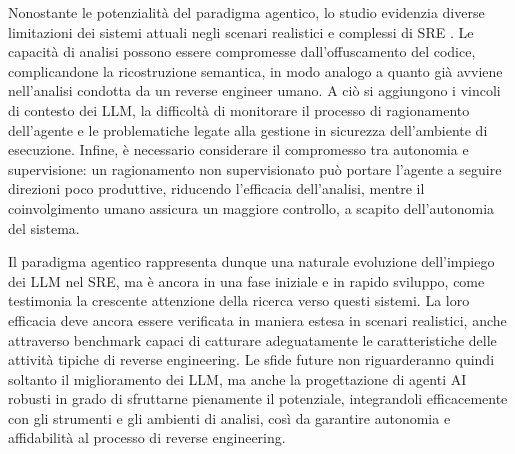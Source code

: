 
Nonostante le potenzialità del paradigma agentico, lo studio evidenzia diverse limitazioni dei sistemi attuali negli scenari realistici e complessi di SRE \cite{radey2026challenges}. Le capacità di analisi possono essere compromesse dall'offuscamento del codice, complicandone la ricostruzione semantica, in modo analogo a quanto già avviene nell'analisi condotta da un reverse engineer umano. A ciò si aggiungono i vincoli di contesto dei LLM, la difficoltà di monitorare il processo di ragionamento dell'agente e le problematiche legate alla gestione in sicurezza dell'ambiente di esecuzione. Infine, è necessario considerare il compromesso tra autonomia e supervisione: un ragionamento non supervisionato può portare l'agente a seguire direzioni poco produttive, riducendo l'efficacia dell'analisi, mentre il coinvolgimento umano assicura un maggiore controllo, a scapito dell'autonomia del sistema.



Il paradigma agentico rappresenta dunque una naturale evoluzione dell'impiego dei LLM nel SRE, ma è ancora in una fase iniziale e in rapido sviluppo, come testimonia la crescente attenzione della ricerca verso questi sistemi. La loro efficacia deve ancora essere verificata in maniera estesa in scenari realistici, anche attraverso benchmark capaci di catturare adeguatamente le caratteristiche delle attività tipiche di reverse engineering. Le sfide future non riguarderanno quindi soltanto il miglioramento dei LLM, ma anche la progettazione di agenti AI robusti in grado di sfruttarne pienamente il potenziale, integrandoli efficacemente con gli strumenti e gli ambienti di analisi, così da garantire autonomia e affidabilità al processo di reverse engineering.

